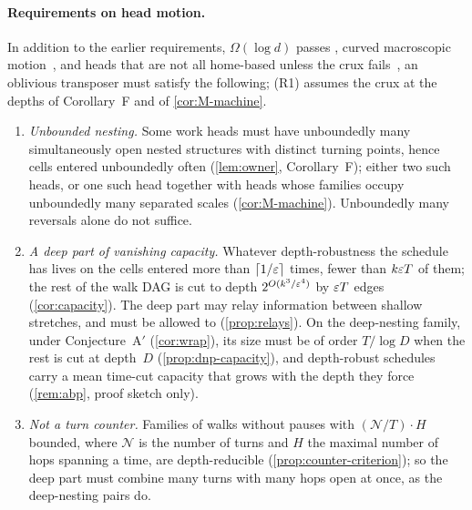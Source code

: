 \paragraph{Requirements on head motion.} In addition to the earlier requirements, $\Omega(\log d)$ passes
\cite[Theorems~5.9 and~5.12]{FirstPaper2026}, curved macroscopic motion~\cite[Theorems~3.10 and~3.12]{FourthPaper2026}, and
heads that are not all home-based unless the crux fails~\cite[Corollary~4.23]{FourthPaper2026}, an oblivious transposer must
satisfy the following; (R1) assumes the crux at the depths of Corollary~F and of \cref{cor:M-machine}.
\begin{enumerate}[label=(R\arabic*),leftmargin=3em]
\item \emph{Unbounded nesting.} Some work heads must have unboundedly many simultaneously open nested structures
with distinct turning points, hence cells entered unboundedly often (\cref{lem:owner}, Corollary~F); either two such heads, or
one such head together with heads whose families occupy unboundedly many separated scales (\cref{cor:M-machine}). Unboundedly
many reversals alone do not suffice.
\item \emph{A deep part of vanishing capacity.} Whatever depth-robustness the schedule has lives on the cells
entered more than $\lceil1/\varepsilon\rceil$ times, fewer than $k\varepsilon T$ of them; the rest of the walk DAG is cut to depth
$2^{O(k^3/\varepsilon^4)}$ by $\varepsilon T$ edges (\cref{cor:capacity}). The deep part may relay information between shallow stretches,
and must be allowed to (\cref{prop:relays}). On the deep-nesting family, under Conjecture~A$'$ (\cref{cor:wrap}), its size must be
of order $T/\log D$ when the rest is cut at depth~$D$ (\cref{prop:dnp-capacity}), and depth-robust schedules carry a mean
time-cut capacity that grows with the depth they force (\cref{rem:abp}, proof sketch only).
\item \emph{Not a turn counter.} Families of walks without pauses with $(\mathcal N/T)\cdot H$ bounded, where $\mathcal N$ is the
number of turns and $H$ the maximal number of hops spanning a time, are depth-reducible (\cref{prop:counter-criterion}); so the
deep part must combine many turns with many hops open at once, as the deep-nesting pairs do.
\end{enumerate}

